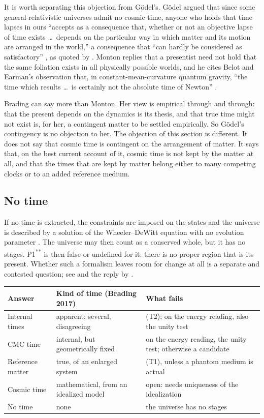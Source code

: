 \documentclass[11pt]{article}
\begin{document}
It is worth separating this objection from Gödel's. Gödel argued that since some
general-relativistic universes admit no cosmic time, anyone who holds that time
lapses in ours ``accepts as a consequence that, whether or not an objective lapse
of time exists \ldots\ depends on the particular way in which matter and its
motion are arranged in the world,'' a consequence that ``can hardly be considered
as satisfactory'' \citep[p.~562]{Godel1949}, as quoted by \citet[sec.~6]{Monton2006}.
Monton replies that a presentist need not hold that the same foliation exists in
all physically possible worlds, and he cites Belot and Earman's observation that,
in constant-mean-curvature quantum gravity, ``the time which results \ldots\ is
certainly not the absolute time of Newton'' \citep[sec.~6]{Monton2006}.

Brading can say more than Monton. Her view is empirical through and through: that
the present depends on the dynamics is its thesis, and that true time might not
exist is, for her, a contingent matter to be settled empirically. So Gödel's
contingency is no objection to her. The objection of this section is different.
It does not say that cosmic time is contingent on the arrangement of matter. It
says that, on the best current account of it, cosmic time is not kept by the
matter at all, and that the times that are kept by matter belong either to many
competing clocks or to an added reference medium.

\subsection{No time}\label{sec:notime}

If no time is extracted, the constraints are imposed on the states and the
universe is described by a solution of the Wheeler--DeWitt equation with no
evolution parameter \citep[sec.~5.3]{Isham1991}. The universe may then count as a
conserved whole, but it has no stages. P1\textsuperscript{**} is then false or
undefined for it: there is no proper region that is its present. Whether such a
formalism leaves room for change at all is a separate and contested question; see
\citet{Earman2002} and the reply by \citet{Maudlin2002}.

\medskip
\begin{center}
\small
\begin{tabular}{@{}llp{6.2cm}@{}}
\toprule
Answer & Kind of time (Brading 2017) & What fails\\
\midrule
Internal times & apparent; several, disagreeing & (T2); on the energy reading, also the unity test\\
CMC time & internal, but geometrically fixed & on the energy reading, the unity test; otherwise a candidate\\
Reference matter & true, of an enlarged system & (T1), unless a phantom medium is actual\\
Cosmic time & mathematical, from an idealized model & open: needs uniqueness of the idealization\\
No time & none & the universe has no stages\\
\bottomrule
\end{tabular}
\end{center}
\medskip
\end{document}
